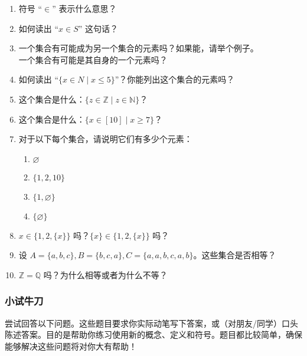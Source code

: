 \begin{enumerate}[label=(\arabic*)]
    \item 符号 ``$\in$'' 表示什么意思？
    \item 如何读出 ``$x \in S$'' 这句话？
    \item 一个集合有可能成为另一个集合的元素吗？如果能，请举个例子。\\
    一个集合有可能是其自身的一个元素吗？
    \item 如何读出 ``$\{x \in N \mid x \le 5\}$''？你能列出这个集合的元素吗？
    \item 这个集合是什么：$\{z \in \mathbb{Z} \mid z \in \mathbb{N}\}$？
    \item 这个集合是什么：$\{x \in [10] \mid x \ge 7\}$？
    \item 对于以下每个集合，请说明它们有多少个元素：
        \begin{enumerate}[label=(\alph*)]
            \item $\varnothing$
            \item $\{1, 2, 10\}$
            \item $\{1, \varnothing\}$
            \item $\{\varnothing\}$
        \end{enumerate}
    \item $x \in \{ 1, 2, \{x\} \}$ 吗？$\{x\} \in \{ 1, 2, \{x\} \}$ 吗？
    \item 设 $A = \{a, b, c\}, B = \{b, c, a\}, C = \{a, a, b, c, a, b\}$。这些集合是否相等？
    \item $\mathbb{Z} = \mathbb{Q}$ 吗？为什么相等或者为什么不等？
\end{enumerate}

\subsubsection*{小试牛刀}

尝试回答以下问题。这些题目要求你实际动笔写下答案，或（对朋友/同学）口头陈述答案。目的是帮助你练习使用新的概念、定义和符号。题目都比较简单，确保能够解决这些问题将对你大有帮助！


